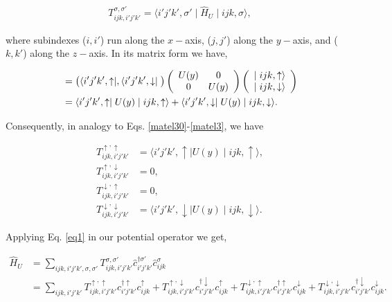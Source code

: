 \documentclass[10pt,prb,showpacs,amssymb,floatfix]{revtex4-1}
\begin{document}
\begin{align}
T_{ijk,i'j'k'}^{\sigma,\sigma'} = \langle i'j'k',\sigma' \mid \hat{H}_{U} \mid ijk, \sigma \rangle,
\end{align}

where subindexes ($i,i'$) run along the $x-$axis, ($j,j'$) along the $y-$axis, and ($k,k'$) along the $z-$axis. In its matrix form we have,

\begin{align}
&=  \big{(} \langle i'j'k',\uparrow \mid , \langle i'j'k',\downarrow \mid \big{)} \left(\begin{array}{cc} 
U(y) &  0\\
0 & U(y)
\end{array}\right)  \left(\begin{array}{c} 
\mid ijk,\uparrow \rangle \\
\mid ijk,\downarrow \rangle
\end{array}\right) \\
&= \langle i'j'k',\uparrow \mid U(y) \mid ijk,\uparrow \rangle +  \langle i'j'k',\downarrow \mid U(y) \mid ijk,\downarrow \rangle.
\label{eqU12}
\end{align}

Consequently, in analogy to Eqs. \eqref{matel30}-\eqref{matel3}, we have
 
\begin{align}
\label{eqU1220}
T_{ijk,i'j'k'}^{\uparrow,\uparrow} &= \langle i'j'k',\uparrow \mid U(y) \mid ijk,\uparrow \rangle, \\
\label{eqU1221}
T_{ijk,i'j'k'}^{\uparrow,\downarrow} &= 0, \\
\label{eqU1222}
T_{ijk,i'j'k'}^{\downarrow,\uparrow} &= 0, \\
T_{ijk,i'j'k'}^{\downarrow,\downarrow} &= \langle i'j'k',\downarrow \mid U(y) \mid ijk,\downarrow \rangle. 
\label{eqU123}
\end{align}

Applying Eq. \eqref{eq1} in our potential operator we get,

\begin{align}
\hat H_{U} &= \sum_{ijk,i'j'k',\sigma,\sigma'} T_{ijk,i'j'k'}^{\sigma,\sigma'} \hat{c}_{i'j'k'}^{\dagger \sigma'} \hat{c}_{ijk}^\sigma \\
&= \sum_{ijk,i'j'k'} T_{ijk,i'j'k'}^{\uparrow,\uparrow} c_{i'j'k'}^{\dagger \uparrow} c_{ijk}^\uparrow +  T_{ijk,i'j'k'}^{\uparrow,\downarrow} c_{i'j'k'}^{\dagger \downarrow} c_{ijk}^\uparrow + T_{ijk,i'j'k'}^{\downarrow,\uparrow} c_{i'j'k'}^{\dagger \uparrow} c_{ijk}^\downarrow + T_{ijk,i'j'k'}^{\downarrow,\downarrow} c_{i'j'k'}^{\dagger \downarrow} c_{ijk}^\downarrow.
\label{lastU}
\end{align}
\end{document}
